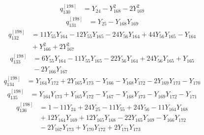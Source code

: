 \begin{equation}\label{q198:row:130}
\begin{aligned}
q_{130}^{[198]} &={} Y_{24} - Y_{168}^{2} - 2Y_{169}^{2}
\end{aligned}
\end{equation}
\begin{equation}\label{q198:row:131}
\begin{aligned}
q_{131}^{[198]} &={} Y_{25} - Y_{168}Y_{169}
\end{aligned}
\end{equation}
\begin{equation}\label{q198:row:132}
\begin{aligned}
q_{132}^{[198]} &={} 11Y_{55}Y_{164} - 12Y_{55}Y_{165} - 24Y_{56}Y_{164} + 44Y_{56}Y_{165} - Y_{164}\\
&{} + Y_{166}^{2} + 2Y_{167}^{2}
\end{aligned}
\end{equation}
\begin{equation}\label{q198:row:133}
\begin{aligned}
q_{133}^{[198]} &={} 6Y_{55}Y_{164} - 11Y_{55}Y_{165} - 22Y_{56}Y_{164} + 24Y_{56}Y_{165} + Y_{165}\\
&{} - 2Y_{166}Y_{167}
\end{aligned}
\end{equation}
\begin{equation}\label{q198:row:134}
\begin{aligned}
q_{134}^{[198]} &={} Y_{164}Y_{172} + 2Y_{165}Y_{173} - Y_{166} - Y_{168}Y_{172} - 2Y_{169}Y_{173} - Y_{170}
\end{aligned}
\end{equation}
\begin{equation}\label{q198:row:135}
\begin{aligned}
q_{135}^{[198]} &={} Y_{164}Y_{173} + Y_{165}Y_{172} - Y_{167} - Y_{168}Y_{173} - Y_{169}Y_{172} - Y_{171}
\end{aligned}
\end{equation}
\begin{equation}\label{q198:row:136}
\begin{aligned}
q_{136}^{[198]} &={} 1 - 11Y_{24} + 24Y_{25} - 11Y_{55} + 24Y_{56} - 11Y_{164}Y_{168}\\
&{} + 12Y_{164}Y_{169} + 12Y_{165}Y_{168} - 22Y_{165}Y_{169} - Y_{166}Y_{172}\\
&{} - 2Y_{167}Y_{173} + Y_{170}Y_{172} + 2Y_{171}Y_{173}
\end{aligned}
\end{equation}

